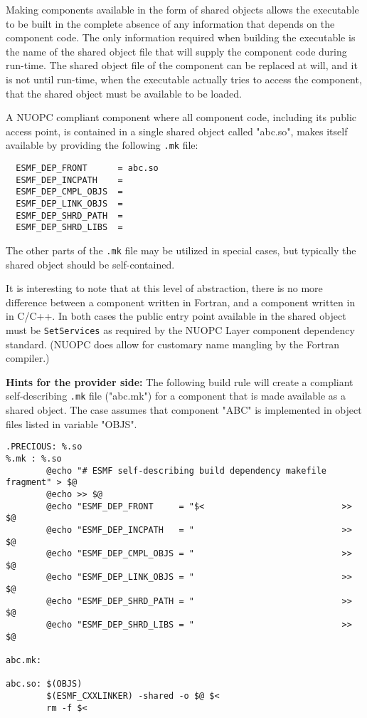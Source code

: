 Making components available in the form of shared objects allows the executable to be built in the complete absence of any information that depends on the component code. The only information required when building the executable is the name of the shared object file that will supply the component code during run-time. The shared object file of the component can be replaced at will, and it is not until run-time, when the executable actually tries to access the component, that the shared object must be available to be loaded.

A NUOPC compliant component where all component code, including its public access point, is contained in a single shared object called "abc.so", makes itself available by providing the following {\tt .mk} file:

\begin{verbatim}
  ESMF_DEP_FRONT      = abc.so
  ESMF_DEP_INCPATH    = 
  ESMF_DEP_CMPL_OBJS  = 
  ESMF_DEP_LINK_OBJS  = 
  ESMF_DEP_SHRD_PATH  = 
  ESMF_DEP_SHRD_LIBS  = 
\end{verbatim}

The other parts of the {\tt .mk} file may be utilized in special cases, but typically the shared object should be self-contained.

It is interesting to note that at this level of abstraction, there is no more difference between a component written in Fortran, and a component written in  in C/C++. In both cases the public entry point available in the shared object must be {\tt SetServices} as required by the NUOPC Layer component dependency standard. (NUOPC does allow for customary name mangling by the Fortran compiler.)

{\bf Hints for the provider side:} The following build rule will create a compliant self-describing {\tt .mk} file ("abc.mk") for a component that is made available as a shared object. The case assumes that component "ABC" is implemented in object files listed in variable "OBJS".

\begin{verbatim}
.PRECIOUS: %.so
%.mk : %.so
        @echo "# ESMF self-describing build dependency makefile fragment" > $@
        @echo >> $@
        @echo "ESMF_DEP_FRONT     = "$<                           >> $@
        @echo "ESMF_DEP_INCPATH   = "                             >> $@
        @echo "ESMF_DEP_CMPL_OBJS = "                             >> $@
        @echo "ESMF_DEP_LINK_OBJS = "                             >> $@
        @echo "ESMF_DEP_SHRD_PATH = "                             >> $@
        @echo "ESMF_DEP_SHRD_LIBS = "                             >> $@

abc.mk:

abc.so: $(OBJS)
        $(ESMF_CXXLINKER) -shared -o $@ $<
        rm -f $<
\end{verbatim}

